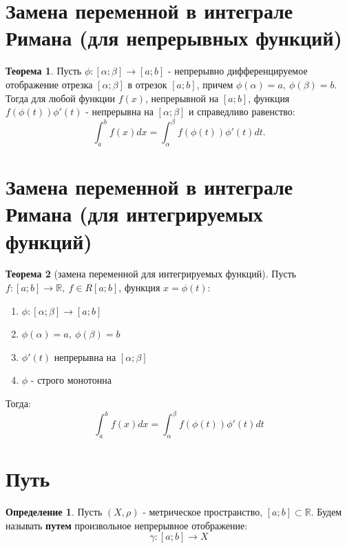 \documentclass{report}
\theoremstyle{definition}
\newtheorem*{definition}{Определение}
\newtheorem*{theorem}{Теорема}
\begin{document}
\section{Замена переменной в интеграле Римана (для непрерывных функций)}

\begin{theorem}
    Пусть $\phi : [\alpha;\beta] \rightarrow [a;b]$ - непрерывно дифференцируемое
    отображение отрезка $[\alpha;\beta]$ в отрезок $[a;b]$, причем $\phi(\alpha)
        = a, \ \phi(\beta) = b$. Тогда для любой функции $f(x)$, непрерывной на $[a;b]$,
    функция $f(\phi(t))\phi'(t)$ - непрерывна на $[\alpha;\beta]$ и справедливо
    равенство:
    \begin{equation*}
        \int_{a}^{b}f(x)dx = \int_{\alpha}^{\beta}f(\phi(t))\phi'(t)dt.
    \end{equation*}
\end{theorem}

\section{Замена переменной в интеграле Римана (для интегрируемых функций)}

\begin{theorem}[замена переменной для интегрируемых функций]
    Пусть $f:[a;b]\rightarrow\mathbb{R}, \ f\in R[a;b]$, функция $x = \phi(t):$
    \begin{enumerate}
        \item $\phi:[\alpha;\beta]\rightarrow[a;b]$
        \item $\phi(\alpha)=a, \ \phi(\beta)=b$
        \item $\phi'(t)$ непрерывна на $[\alpha;\beta]$
        \item $\phi$ - строго монотонна
    \end{enumerate}
    Тогда:
    \begin{equation*}
        \int_{a}^{b}f(x)dx = \int_{\alpha}^{\beta}f(\phi(t))\phi'(t)dt
    \end{equation*}
\end{theorem}

\section{Путь}

\begin{definition}
    Пусть $(X,\rho)$ - метрическое пространство, $[a;b] \subset \mathbb{R}$. Будем называть \textbf{путем}
    произвольное непрерывное отображение:
    \begin{equation*}
        \gamma:[a;b]\rightarrow X
    \end{equation*}
\end{definition}
\end{document}
